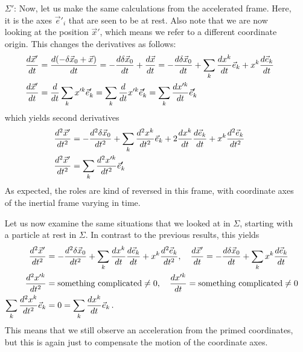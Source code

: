 \documentclass[../class_mech_main.tex]{subfiles}
\begin{document}
\begin{itemize}
	\item[$\Sigma'$:] Now, let us make the same calculations from the accelerated frame. Here, it is the axes $\vec{e}'_i$ that are seen to be at rest. Also note that we are now looking at the position $\vec{x}'$, which means we refer to a different coordinate origin. This changes the derivatives as follows:
	\begin{align}
		\dv{\vec{x}'}{t} &= \dv{(-\delta \vec{x}_0 + \vec{x})}{t} = -\dv{\delta \vec{x}_0}{t} + \dv{\vec{x}}{t} = -\dv{\delta \vec{x}_0}{t} + \sum_k \dv{x^k}{t} \vec{e}_k + x^k \dv{\vec{e}_k}{t}
		\label{eq:velocity_from_accel_frame_in_inert_frame}
		\\
		\dv{\vec{x}'}{t} &= \dv{t} \sum_k x'^k \vec{e}'_k = \sum_k \dv{t} x'^k \vec{e}'_k = \sum_k \dv{x'^k}{t} \vec{e}'_k
		\label{eq:velocity_from_accel_frame_in_accel_frame}
	\end{align}
	which yields second derivatives
	\begin{align}
		\dv[2]{\vec{x}'}{t} &= -\dv[2]{\delta \vec{x}_0}{t} + \sum_k \dv[2]{x^k}{t} \vec{e}_k + 2 \dv{x^k}{t} \dv{\vec{e}_k}{t} + x^k \dv[2]{\vec{e}_k}{t}
		\label{eq:acceleration_from_accel_frame_in_inert_frame}
		\\
		\dv[2]{\vec{x}'}{t} &= \sum_k \dv[2]{x'^k}{t} \vec{e}'_k
		\label{eq:acceleration_from_accel_frame_in_accel_frame}
	\end{align}
	As expected, the roles are kind of reversed in this frame, with coordinate axes of the inertial frame varying in time.


	Let us now examine the same situations that we looked at in $\Sigma$, starting with a particle at rest in $\Sigma$. In contrast to the previous results, this yields
	\begin{align*}
		\dv[2]{\vec{x}'}{t} &= -\dv[2]{\delta \vec{x}_0}{t} + \sum_k \dv{x^k}{t} \dv{\vec{e}_k}{t} + x^k \dv[2]{\vec{e}_k}{t},
		\quad \dv{\vec{x}'}{t} = -\dv{\delta \vec{x}_0}{t} + \sum_k x^k \dv{\vec{e}_k}{t}
		\\
		\dv[2]{x'^k}{t} &= \text{something complicated} \neq 0,
		\quad \dv{x'^k}{t} = \text{something complicated} \neq 0
		\\
		\sum_k \dv[2]{x^k}{t} \vec{e}_k &= 0 = \sum_k \dv{x^k}{t} \vec{e}_k \, .
	\end{align*}
	This means that we still observe an acceleration from the primed coordinates, but this is again just to compensate the motion of the coordinate axes.


\end{itemize}
\end{document}
